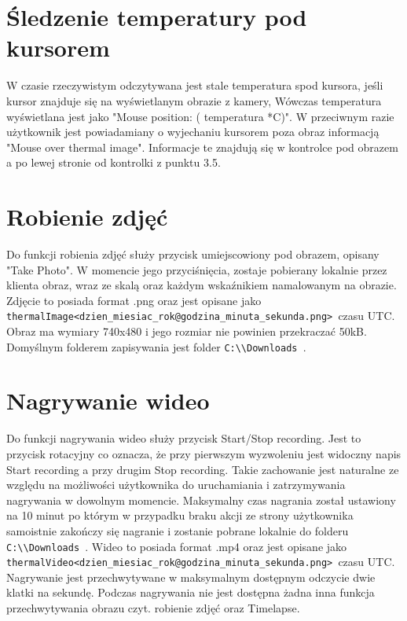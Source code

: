 \documentclass[a4paper,twoside,12pt]{book}
\begin{document}
\section{Śledzenie temperatury pod kursorem}
W czasie rzeczywistym odczytywana jest stale temperatura spod kursora, jeśli kursor znajduje się na wyświetlanym obrazie z kamery, Wówczas temperatura wyświetlana jest jako "Mouse position: ( temperatura *C)". W przeciwnym razie użytkownik jest powiadamiany o wyjechaniu kursorem poza obraz informacją "Mouse over thermal image". Informacje te znajdują się w kontrolce pod obrazem a po lewej stronie od kontrolki z punktu 3.5.
\section{Robienie zdjęć}
Do funkcji robienia zdjęć służy przycisk umiejscowiony pod obrazem, opisany "Take Photo". W momencie jego przyciśnięcia, zostaje pobierany lokalnie przez klienta obraz, wraz ze skalą oraz każdym wskaźnikiem namalowanym na obrazie. Zdjęcie to posiada format .png oraz jest opisane jako \lstinline|thermalImage<dzien_miesiac_rok@godzina_minuta_sekunda.png> |czasu UTC. Obraz ma wymiary 740x480 i jego rozmiar nie powinien przekraczać 50kB. Domyślnym folderem zapisywania jest folder \lstinline|C:\\Downloads |.
\section{Nagrywanie wideo}
Do funkcji nagrywania wideo służy przycisk Start/Stop recording. Jest to przycisk rotacyjny co oznacza, że przy pierwszym wyzwoleniu jest widoczny napis Start recording a przy drugim Stop recording. Takie zachowanie jest naturalne ze względu na możliwości użytkownika do uruchamiania i zatrzymywania nagrywania w dowolnym momencie. Maksymalny czas nagrania został ustawiony na 10 minut po którym w przypadku braku akcji ze strony użytkownika samoistnie zakończy się nagranie i zostanie pobrane lokalnie do folderu \lstinline|C:\\Downloads |. Wideo to posiada format .mp4 oraz jest opisane jako \lstinline|thermalVideo<dzien_miesiac_rok@godzina_minuta_sekunda.png> |czasu UTC. Nagrywanie jest przechwytywane w maksymalnym dostępnym odczycie dwie klatki na sekundę. Podczas nagrywania nie jest dostępna żadna inna funkcja przechwytywania obrazu czyt. robienie zdjęć oraz Timelapse.
\end{document}
